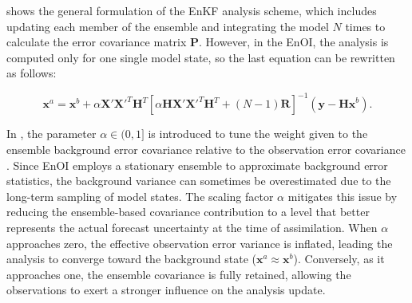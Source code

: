  shows the general formulation of the EnKF analysis scheme, which includes updating each member of the ensemble and integrating the model $N$ times to calculate the error covariance matrix $\mathbf{P}$. However, in the EnOI, the analysis is computed only for one single model state, so the last equation can be rewritten as follows:

\begin{equation}\label{eq:cp2_enoi}
    \mathbf{x}^a=\mathbf{x}^b + \alpha\mathbf{X'X'}^T \mathbf{H}^T \left[ \alpha\mathbf{HX'X'}^T \mathbf{H}^T +(N-1) \mathbf{R}\right]^{-1} \left( \mathbf{y}-\mathbf{Hx}^b \right).
\end{equation}

In , the parameter $\alpha\in(0,1]$ is introduced to tune the weight given to the ensemble background error covariance relative to the observation error covariance \parencite{evensen2003ensemble}. Since EnOI employs a stationary ensemble to approximate background error statistics, the background variance can sometimes be overestimated due to the long-term sampling of model states. The scaling factor $\alpha$ mitigates this issue by reducing the ensemble-based covariance contribution to a level that better represents the actual forecast uncertainty at the time of assimilation. When $\alpha$ approaches zero, the effective observation error variance is inflated, leading the analysis to converge toward the background state ($\mathbf{x}^a \approx \mathbf{x}^b$). Conversely, as it approaches one, the ensemble covariance is fully retained, allowing the observations to exert a stronger influence on the analysis update.
